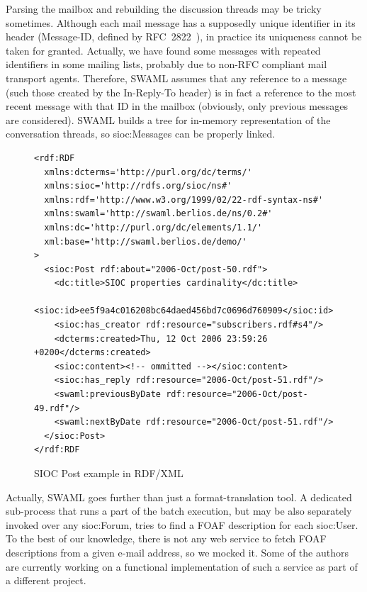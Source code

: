 \documentclass{llncs}
\begin{document}

Parsing the mailbox and rebuilding the discussion threads may be
tricky sometimes. Although each mail message has a supposedly unique
identifier in its header (\textsf{Message-ID}, defined by
RFC~2822~\cite{RFC2822}), in practice its uniqueness cannot be
taken for granted. Actually, we have found some
messages with repeated identifiers in some mailing lists,
probably due to non-RFC compliant mail transport agents.
Therefore, SWAML assumes that any reference to a message
(such those created by the \textsf{In-Reply-To} header)
is in fact a reference to the most recent message with that ID
in the mailbox (obviously, only previous messages are
considered). SWAML builds a tree for in-memory representation
of the conversation threads, so \textsf{sioc:Message}s can be
properly linked.

\begin{figure}[ht]
\lstset{language=RDF}
\begin{lstlisting}
<rdf:RDF
  xmlns:dcterms='http://purl.org/dc/terms/'
  xmlns:sioc='http://rdfs.org/sioc/ns#'
  xmlns:rdf='http://www.w3.org/1999/02/22-rdf-syntax-ns#'
  xmlns:swaml='http://swaml.berlios.de/ns/0.2#'
  xmlns:dc='http://purl.org/dc/elements/1.1/'
  xml:base='http://swaml.berlios.de/demo/'
>
  <sioc:Post rdf:about="2006-Oct/post-50.rdf">
    <dc:title>SIOC properties cardinality</dc:title>
    <sioc:id>ee5f9a4c016208bc64daed456bd7c0696d760909</sioc:id>
    <sioc:has_creator rdf:resource="subscribers.rdf#s4"/>
    <dcterms:created>Thu, 12 Oct 2006 23:59:26 +0200</dcterms:created>
    <sioc:content><!-- ommitted --></sioc:content>
    <sioc:has_reply rdf:resource="2006-Oct/post-51.rdf"/>
    <swaml:previousByDate rdf:resource="2006-Oct/post-49.rdf"/>
    <swaml:nextByDate rdf:resource="2006-Oct/post-51.rdf"/>
  </sioc:Post>
</rdf:RDF
\end{lstlisting}
\caption{SIOC Post example in RDF/XML}
\label{fig:rdfexample}
\end{figure}

Actually, SWAML goes further than just a format-translation
tool. A dedicated sub-process that runs a part of the batch
execution, but may be also separately invoked over any
\textsf{sioc:Forum}, tries to find a FOAF description for
each \textsf{sioc:User}. To the best of our knowledge, there is not
any web service to fetch FOAF descriptions from a given e-mail
address, so we mocked it. Some of the authors are currently working
on a functional implementation of such a service as part of a
different project.
\end{document}
